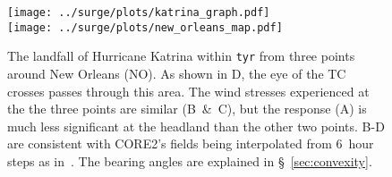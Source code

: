
\begin{figure}[htb!]
\centering
\texttt{[image: ../surge/plots/katrina\_graph.pdf]}\\
\vspace{-9pt}
\texttt{[image: ../surge/plots/new\_orleans\_map.pdf]}
\caption{The landfall of Hurricane Katrina within \texttt{tyr}  from three points
 around New Orleans (NO). As shown in D, the eye of the TC
crosses passes through this area. The wind stresses experienced at the
the three points are similar (B~\&~C), but the response (A) is much
less significant at the headland than the other two points.
B-D are consistent with CORE2's fields being interpolated from 6~hour
steps as in~\cite{core2expert}.
The bearing angles are explained in §~\ref{sec:convexity}.
}
\label{fig:katrina}
\end{figure}

